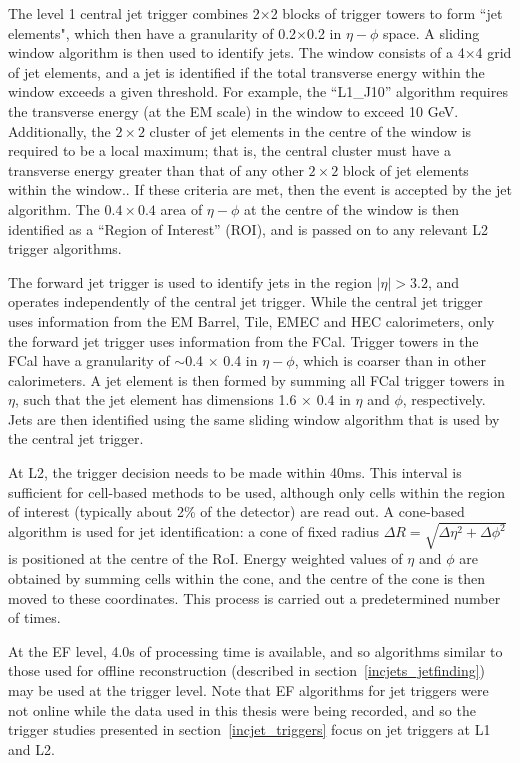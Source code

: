 The level 1 central jet trigger combines 2$\times$2 blocks of trigger towers to form ``jet elements", which then have a granularity of  0.2$\times$0.2 in $\eta - \phi$ space. A sliding window algorithm\cite{ATLAS_L1Calo} is then used to identify jets. The window consists of a 4$\times$4 grid of jet elements, and a jet is identified if the total transverse energy within the window exceeds a given threshold. For example, the ``L1\_J10'' algorithm requires the transverse energy (at the EM scale) in the window to exceed 10 GeV. Additionally, the $2 \times 2$ cluster of jet elements in the centre of the window is required to be a local maximum; that is, the central cluster must have a transverse energy greater than that of any other $2\times2$ block of jet elements within the window.. If these criteria are met, then the event is accepted by the jet algorithm. The $0.4\times0.4$ area of $\eta-\phi$ at the centre of the window is then identified as a ``Region of Interest'' (ROI), and is passed on to any relevant L2 trigger algorithms. 

The forward jet trigger is used to identify jets in the region $|\eta| > 3.2$, and operates independently of the central jet trigger. While the central jet trigger uses information from the EM Barrel, Tile, EMEC and HEC calorimeters, only the forward jet trigger uses information from the FCal. Trigger towers in the FCal have a granularity of $\sim$0.4 $\times$ 0.4 in $\eta-\phi$, which is coarser than in other calorimeters. A jet element is then formed by summing all FCal trigger towers in $\eta$, such that the jet element has dimensions 1.6 $\times$ 0.4 in $\eta$ and $\phi$, respectively\cite{ATLAS_L1Calo}. Jets are then identified using the same sliding window algorithm that is used by the central jet trigger\cite{JEM_spec}.


At L2, the trigger decision needs to be made within 40ms. This interval is sufficient for cell-based methods to be used, although only cells within the region of interest (typically about 2\% of the detector) are read out. A cone-based algorithm is used for jet identification: a cone of fixed radius $\Delta R = \sqrt{\Delta \eta^2 + \Delta \phi^2}$ is positioned at the centre of the RoI. Energy weighted values of $\eta$ and $\phi$ are obtained by summing cells within the cone, and the centre of the cone is then moved to these coordinates. This process is carried out a predetermined number of times.

At the EF level, 4.0s of processing time is available, and so algorithms similar to those used for offline reconstruction (described in section~\ref{incjets_jetfinding}) may be used at the trigger level. Note that EF algorithms for jet triggers were not online while the data used in this thesis were being recorded, and so the trigger studies presented in section~\ref{incjet_triggers} focus on jet triggers at L1 and L2.



